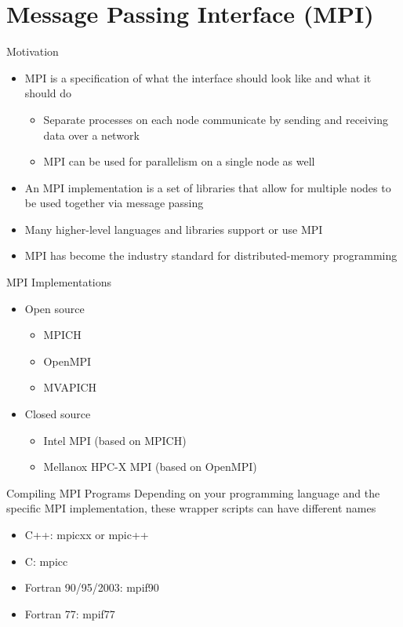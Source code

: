 \section{Message Passing Interface (MPI)}

\begin{frame}{Motivation}
\begin{itemize}
\item MPI is a specification of what the interface should look like and what it should do
\begin{itemize}
\item Separate processes on each node communicate by sending and receiving data over a network
\item MPI can be used for parallelism on a single node as well
\end{itemize}
\item An MPI implementation is a set of libraries that allow for multiple nodes to be used together via message passing
\item Many higher-level languages and libraries support or use MPI
\item MPI has become the industry standard for distributed-memory programming
\end{itemize}
\end{frame}

\begin{frame}{MPI Implementations}
\begin{itemize}
\item Open source
\begin{itemize}
\item MPICH
\item OpenMPI
\item MVAPICH
\end{itemize}
\item Closed source
\begin{itemize}
\item Intel MPI (based on MPICH)
\item Mellanox HPC-X MPI (based on OpenMPI)
\end{itemize}
\end{itemize}
\end{frame}

\begin{frame}{Compiling MPI Programs}
Depending on your programming language and the specific MPI implementation,
these wrapper scripts can have different names
\begin{itemize}
\item C++: mpicxx or mpic++
\item C: mpicc
\item Fortran 90/95/2003: mpif90
\item Fortran 77: mpif77
\end{itemize}
\end{frame}

